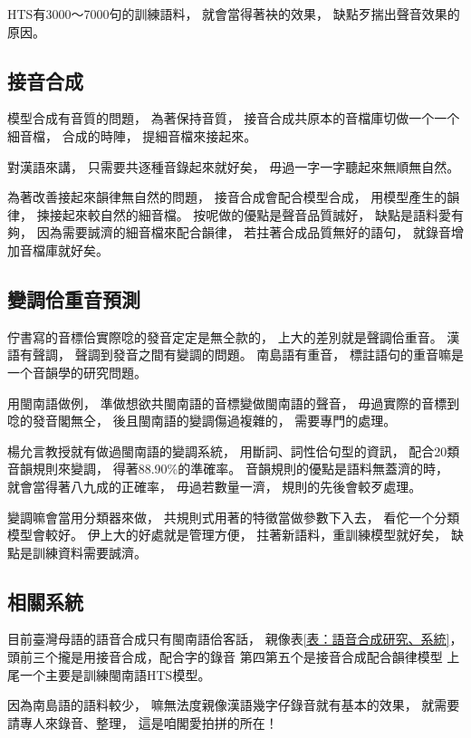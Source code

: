 HTS有3000～7000句的訓練語料，
就會當得著袂的效果，
缺點歹揣出聲音效果的原因。


\subsection{接音合成}
\label{小節：接音合成}
模型合成有音質的問題，
為著保持音質，
接音合成共原本的音檔庫切做一个一个細音檔，
合成的時陣，
提細音檔來接起來。

對漢語來講，
只需要共逐種音錄起來就好矣，
毋過一字一字聽起來無順無自然。

為著改善接起來韻律無自然的問題，
接音合成會配合模型合成，
用模型產生的韻律，
揀接起來較自然的細音檔。
按呢做的優點是聲音品質誠好，
缺點是語料愛有夠，
因為需要誠濟的細音檔來配合韻律，
若拄著合成品質無好的語句，
就錄音增加音檔庫就好矣。

\subsection{變調佮重音預測}
\label{小節：變調佮重音預測}
佇書寫的音標佮實際唸的發音定定是無仝款的，
上大的差別就是聲調佮重音。
漢語有聲調，
聲調到發音之間有變調的問題。
南島語有重音，
標註語句的重音嘛是一个音韻學的研究問題。

用閩南語做例，
準做想欲共閩南語的音標變做閩南語的聲音，
毋過實際的音標到唸的發音閣無仝，
後且閩南語的變調傷過複雜的，
需要專門的處理。

楊允言教授就有做過閩南語的變調系統\cite{iunn:台語變調系統實作研究}，
用斷詞、詞性佮句型的資訊，
配合20類音韻規則來變調，
得著88.90\%的準確率。
音韻規則的優點是語料無蓋濟的時，
就會當得著八九成的正確率，
毋過若數量一濟，
規則的先後會較歹處理。

變調嘛會當用分類器來做，
共規則式用著的特徵當做參數下入去，
看佗一个分類模型會較好。
伊上大的好處就是管理方便，
拄著新語料，重訓練模型就好矣，
缺點是訓練資料需要誠濟。

\subsection{相關系統}
\label{小節：語音合成相關系統}
目前臺灣母語的語音合成只有閩南語佮客話，
親像表\ref{表：語音合成研究、系統}，
頭前三个攏是用接音合成，配合字的錄音
第四第五个是接音合成配合韻律模型
上尾一个主要是訓練閩南語HTS模型。

因為南島語的語料較少，
嘛無法度親像漢語幾字仔錄音就有基本的效果，
就需要請專人來錄音、整理，
這是咱閣愛拍拼的所在！

